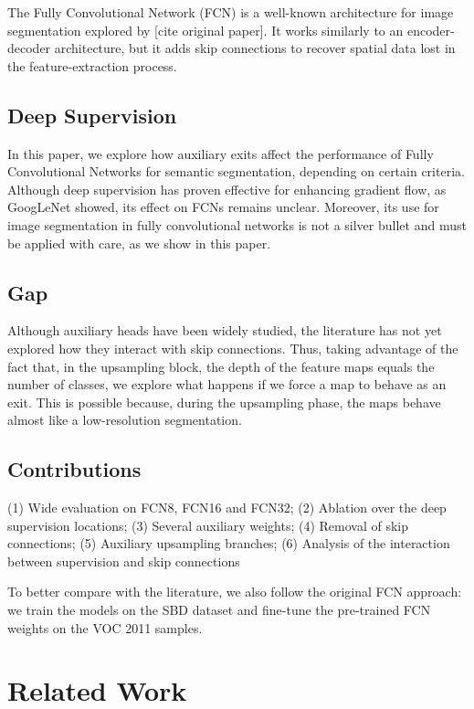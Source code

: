 \documentclass{article}
\begin{document}
    The Fully Convolutional Network (FCN) \cite{ref_fcn} is a well-known architecture for image segmentation explored by [cite original paper]. It works similarly to an encoder-decoder architecture, but it adds skip connections to recover spatial data lost in the feature-extraction process.

    \subsection{Deep Supervision}

    In this paper, we explore how auxiliary exits affect the performance of Fully Convolutional Networks for semantic segmentation, depending on certain criteria. Although deep supervision has proven effective for enhancing gradient flow, as GoogLeNet \cite{ref_googlenet} showed, its effect on FCNs remains unclear. Moreover, its use for image segmentation in fully convolutional networks is not a silver bullet and must be applied with care, as we show in this paper.

    \subsection{Gap}

    Although auxiliary heads have been widely studied, the literature has not yet explored how they interact with skip connections. Thus, taking advantage of the fact that, in the upsampling block, the depth of the feature maps equals the number of classes, we explore what happens if we force a map to behave as an exit. This is possible because, during the upsampling phase, the maps behave almost like a low-resolution segmentation.

    \subsection{Contributions}

    (1) Wide evaluation on FCN8, FCN16 and FCN32; (2) Ablation over the deep supervision locations; (3) Several auxiliary weights; (4) Removal of skip connections; (5) Auxiliary upsampling branches; (6) Analysis of the interaction between supervision and skip connections

    To better compare with the literature, we also follow the original FCN approach: we train the models on the SBD dataset and fine-tune the pre-trained FCN weights on the VOC 2011 samples.


\section{Related Work}
\end{document}
